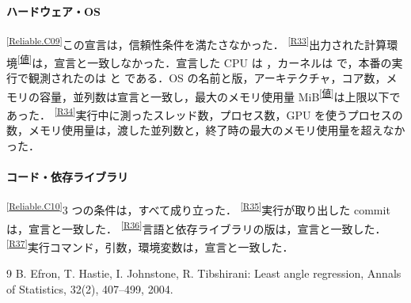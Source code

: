 \documentclass[9pt,a4paper,twocolumn]{ltjsarticle}
\newcommand{\repositoryurl}{https://github.com/auto-res2/formal-first-diabetes-regression-5}
\newcommand{\schemaurl}{\repositoryurl/blob/\SchemaCommit/formal/claims.json}
\newcommand{\cid}[1]{\textsuperscript{\textsf{\scriptsize[\href{\schemaurl\#L\csname line#1\endcsname}{#1}]}}}
\newcommand{\val}[1]{\textsuperscript{\textsf{\scriptsize[\href{\schemaurl\#L\csname line#1\endcsname}{値}]}}}
\begin{document}
\paragraph{ハードウェア・OS}
\cid{Reliable.C09}この宣言は，信頼性条件を満たさなかった．
\cid{R33}出力された計算環境\val{observedEnvironment}は，宣言と一致しなかった．宣言した CPU は \DeclaredCpuModel，カーネルは \DeclaredKernelRelease{} で，本番の実行で観測されたのは \ObservedCpuModel{} と \ObservedKernelRelease{} である．OS の名前と版，アーキテクチャ，コア数，メモリの容量，並列数は宣言と一致し，最大のメモリ使用量 \MaxMemoryUsage{} MiB\val{finalMaxMemoryMebibytes}は上限以下であった．
\cid{R34}実行中に測ったスレッド数，プロセス数，GPU を使うプロセスの数，メモリ使用量は，渡した並列数と，終了時の最大のメモリ使用量を超えなかった．

\paragraph{コード・依存ライブラリ}
\cid{Reliable.C10}3 つの条件は，すべて成り立った．
\cid{R35}実行が取り出した commit は，宣言と一致した．
\cid{R36}言語と依存ライブラリの版は，宣言と一致した．
\cid{R37}実行コマンド，引数，環境変数は，宣言と一致した．

\begin{thebibliography}{9}
\small
{} B. Efron, T. Hastie, I. Johnstone, R. Tibshirani: Least angle regression, Annals of Statistics, 32(2), 407--499, 2004.
\end{thebibliography}
\end{document}
